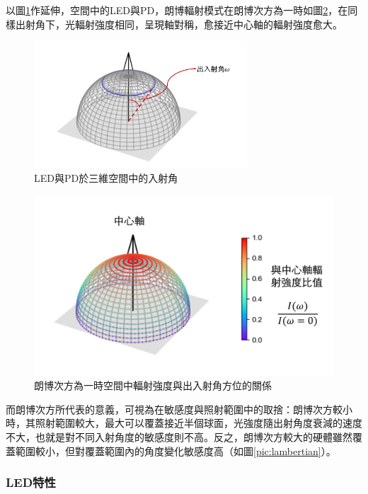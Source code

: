        以圖\ref{pic:angle_3d}作延伸，空間中的LED與PD，朗博輻射模式在朗博次方為一時如圖\ref{pic:lambertian_3d}，在同樣出射角下，光輻射強度相同，呈現軸對稱，愈接近中心軸的輻射強度愈大。

        \begin{figure}[ht]
            \centering
            \includegraphics[width=8cm]{ch2pic/3d_angle.png}
            \caption{LED與PD於三維空間中的入射角}
            \label{pic:angle_3d}
        \end{figure}

        \begin{figure}[ht]
            \centering
            \includegraphics[width=12cm]{ch2pic/lambertian_3d.png}
            \caption{朗博次方為一時空間中輻射強度與出入射角方位的關係}
            \label{pic:lambertian_3d}
        \end{figure}

        而朗博次方所代表的意義，可視為在敏感度與照射範圍中的取捨：朗博次方較小時，其照射範圍較大，最大可以覆蓋接近半個球面，光強度隨出射角度衰減的速度不大，也就是對不同入射角度的敏感度則不高。反之，朗博次方較大的硬體雖然覆蓋範圍較小，但對覆蓋範圍內的角度變化敏感度高（如圖\ref{pic:lambertian}）。

        

        \subsubsection{LED特性}
        \label{chp:LED}

